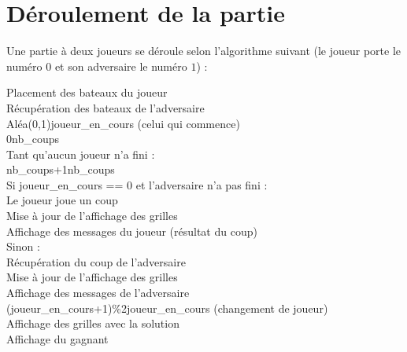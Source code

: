 \section{Déroulement de la partie}

Une partie à deux joueurs se déroule selon l'algorithme suivant (le joueur porte le numéro $0$ et son adversaire le numéro $1$) :

\begin{algo1}\label{algo_partie}
Placement des bateaux du joueur\\
Récupération des bateaux de l'adversaire\\
Aléa(0,1)\sto joueur\_en\_cours (celui qui commence)\\
0\sto nb\_coups\\
Tant qu'aucun joueur n'a fini :\\
nb\_coups+1\sto nb\_coups\\
Si joueur\_en\_cours == 0 et l'adversaire n'a pas fini :\\
Le joueur joue un coup\\
Mise à jour de l'affichage des grilles\\
Affichage des messages du joueur (résultat du coup)\\
Sinon :\\
Récupération du coup de l'adversaire\\
Mise à jour de l'affichage des grilles\\
Affichage des messages de l'adversaire\\
(joueur\_en\_cours+1)\%2\sto joueur\_en\_cours (changement de joueur)\\
Affichage des grilles avec la solution\\
Affichage du gagnant\\
\end{algo1}

